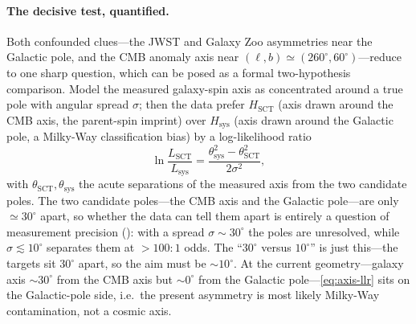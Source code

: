 \paragraph{The decisive test, quantified.} Both confounded clues---the JWST and
Galaxy Zoo asymmetries near the Galactic pole, and the CMB anomaly axis near
$(\ell,b)\simeq(260^\circ,60^\circ)$---reduce to one sharp question, which can be
posed as a formal two-hypothesis comparison. Model the measured galaxy-spin axis as
concentrated around a true pole with angular spread $\sigma$; then the data prefer
$H_{\mathrm{SCT}}$ (axis drawn around the CMB axis, the parent-spin imprint) over
$H_{\mathrm{sys}}$ (axis drawn around the Galactic pole, a Milky-Way classification
bias) by a log-likelihood ratio
\begin{equation}
  \ln\frac{L_{\mathrm{SCT}}}{L_{\mathrm{sys}}}
  = \frac{\theta_{\mathrm{sys}}^2 - \theta_{\mathrm{SCT}}^2}{2\sigma^2},
  \label{eq:axis-llr}
\end{equation}
with $\theta_{\mathrm{SCT}},\theta_{\mathrm{sys}}$ the acute separations of the
measured axis from the two candidate poles. The two candidate poles---the CMB axis and
the Galactic pole---are only $\simeq30^\circ$ apart, so whether the data can tell them
apart is entirely a question of measurement precision (): with a
spread $\sigma\sim30^\circ$ the poles are unresolved, while $\sigma\lesssim10^\circ$
separates them at $>\!100\!:\!1$ odds. The ``$30^\circ$ versus $10^\circ$'' is just
this---the targets sit $30^\circ$ apart, so the aim must be $\sim\!10^\circ$. At the
current geometry---galaxy axis $\sim\!30^\circ$ from the CMB axis but $\sim\!0^\circ$
from the Galactic pole---\eqref{eq:axis-llr} sits on the Galactic-pole side, i.e.\ the
present asymmetry is most likely Milky-Way contamination, not a cosmic axis.

